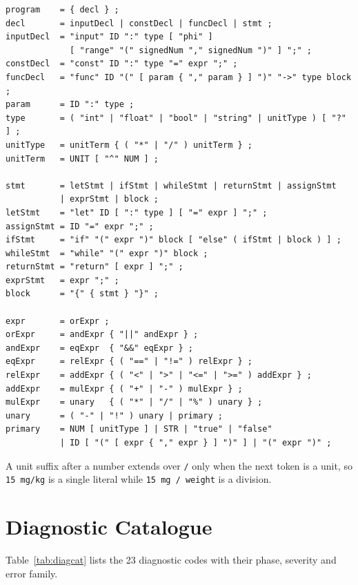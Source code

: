 \documentclass[conference]{IEEEtran}
\newcommand{\code}[1]{\texttt{#1}}
\begin{document}
\begin{lstlisting}[language={}]
program    = { decl } ;
decl       = inputDecl | constDecl | funcDecl | stmt ;
inputDecl  = "input" ID ":" type [ "phi" ]
             [ "range" "(" signedNum "," signedNum ")" ] ";" ;
constDecl  = "const" ID ":" type "=" expr ";" ;
funcDecl   = "func" ID "(" [ param { "," param } ] ")" "->" type block ;
param      = ID ":" type ;
type       = ( "int" | "float" | "bool" | "string" | unitType ) [ "?" ] ;
unitType   = unitTerm { ( "*" | "/" ) unitTerm } ;
unitTerm   = UNIT [ "^" NUM ] ;

stmt       = letStmt | ifStmt | whileStmt | returnStmt | assignStmt
           | exprStmt | block ;
letStmt    = "let" ID [ ":" type ] [ "=" expr ] ";" ;
assignStmt = ID "=" expr ";" ;
ifStmt     = "if" "(" expr ")" block [ "else" ( ifStmt | block ) ] ;
whileStmt  = "while" "(" expr ")" block ;
returnStmt = "return" [ expr ] ";" ;
exprStmt   = expr ";" ;
block      = "{" { stmt } "}" ;

expr       = orExpr ;
orExpr     = andExpr { "||" andExpr } ;
andExpr    = eqExpr  { "&&" eqExpr } ;
eqExpr     = relExpr { ( "==" | "!=" ) relExpr } ;
relExpr    = addExpr { ( "<" | ">" | "<=" | ">=" ) addExpr } ;
addExpr    = mulExpr { ( "+" | "-" ) mulExpr } ;
mulExpr    = unary   { ( "*" | "/" | "%" ) unary } ;
unary      = ( "-" | "!" ) unary | primary ;
primary    = NUM [ unitType ] | STR | "true" | "false"
           | ID [ "(" [ expr { "," expr } ] ")" ] | "(" expr ")" ;
\end{lstlisting}

A unit suffix after a number extends over \code{/} only when the next token is a unit, so \code{15 mg/kg} is a single
literal while \code{15 mg / weight} is a division.

\section{Diagnostic Catalogue}\label{app:diag}
Table~\ref{tab:diagcat} lists the 23 diagnostic codes with their phase, severity and error family.
\end{document}
